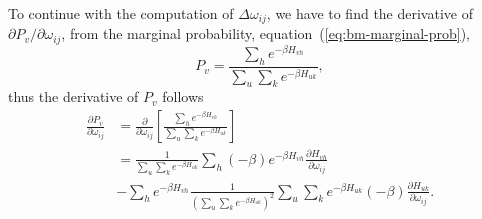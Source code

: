 To continue with the computation of $\Delta \omega_{ij}$, we have to find the derivative of $\partial P_{v}/\partial \omega_{ij}$, from the marginal probability, equation~(\ref{eq:bm-marginal-prob}),
\begin{equation}
  \label{eq:bm-marginal-prob-expansion}
  P_{v} = \frac{\sum_{h} e^{-\beta H_{vh}}}{\sum_{u} \sum_{k} e^{-\beta H_{u k}}},
\end{equation}
thus the derivative of $P_{v}$ follows
\begin{equation}
  \label{eq:bm-marginal-prob-grad}
  \begin{split}
    \frac{\partial P_{v}}{\partial \omega_{ij}} & = \frac{\partial}{\partial \omega_{ij}} \left[ \frac{\sum_{h} e^{-\beta H_{vh}}}{\sum_{u} \sum_{k} e^{-\beta H_{u k}}} \right] \\
    & = \frac{1}{\sum_{u} \sum_{k} e^{-\beta H_{u k}}} \sum_{h} (-\beta) e^{-\beta H_{vh}} \frac{\partial H_{vh}}{\partial \omega_{ij}} \\
    & - \sum_{h} e^{-\beta H_{vh}} \frac{1}{{\left( \sum_{u} \sum_{k} e^{-\beta H_{u k}} \right)}^{2}} \sum_{u} \sum_{k} e^{-\beta H_{u k}} (-\beta) \frac{\partial H_{u k}}{\partial \omega_{ij}}.
  \end{split}
\end{equation}

